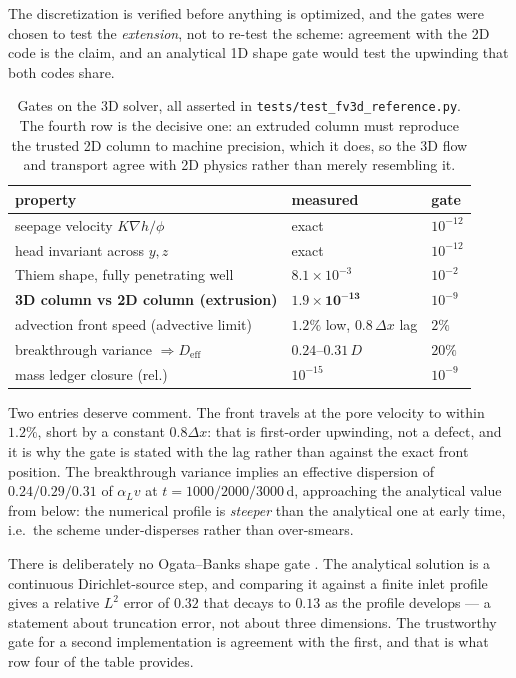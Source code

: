 The discretization is verified before anything is optimized, and the gates were
chosen to test the \emph{extension}, not to re-test the scheme: agreement with
the 2D code is the claim, and an analytical 1D shape gate would test the
upwinding that both codes share.

\begin{table}[t]
  \centering
  \caption{Gates on the 3D solver, all asserted in
    \texttt{tests/test\_fv3d\_reference.py}. The fourth row is the decisive one:
    an extruded column must reproduce the trusted 2D column to machine
    precision, which it does, so the 3D flow and transport agree with 2D physics
    rather than merely resembling it.}
  \label{tab:3d-gates}
  \begin{tabular}{@{}lll@{}}
    \toprule
    property & measured & gate \\
    \midrule
    seepage velocity $K\nabla h/\phi$ & exact & $10^{-12}$ \\
    head invariant across $y,z$ & exact & $10^{-12}$ \\
    Thiem shape, fully penetrating well & $8.1\times10^{-3}$ & $10^{-2}$ \\
    \textbf{3D column vs 2D column (extrusion)} & $\mathbf{1.9\times10^{-13}}$ & $10^{-9}$ \\
    advection front speed (advective limit) & $1.2\%$ low, $0.8\,\Delta x$ lag & $2\%$ \\
    breakthrough variance $\Rightarrow D_{\text{eff}}$ & $0.24$--$0.31\,D$ & $20\%$ \\
    mass ledger closure (rel.) & $10^{-15}$ & $10^{-9}$ \\
    \bottomrule
  \end{tabular}
\end{table}

Two entries deserve comment. The front travels at the pore velocity to within
$1.2\%$, short by a constant $0.8\Delta x$: that is first-order upwinding, not a
defect, and it is why the gate is stated with the lag rather than against the
exact front position. The breakthrough variance implies an effective dispersion
of $0.24/0.29/0.31$ of $\alpha_L v$ at $t=1000/2000/3000$\,d, approaching the
analytical value from below: the numerical profile is \emph{steeper} than the
analytical one at early time, i.e.\ the scheme under-disperses rather than
over-smears.

There is deliberately no Ogata--Banks shape gate \citep{ogata1961solution}. The
analytical solution is a continuous Dirichlet-source step, and comparing it
against a finite inlet profile gives a relative $L^2$ error of $0.32$ that decays
to $0.13$ as the profile develops --- a statement about truncation error, not
about three dimensions. The trustworthy gate for a second implementation is
agreement with the first, and that is what row four of the table provides.

